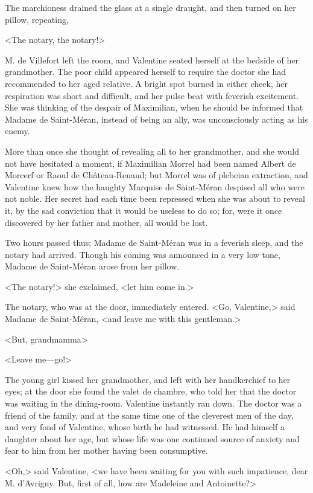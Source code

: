 The marchioness drained the glass at a single draught, and then turned on her pillow, repeating, 

 <The notary, the notary!> 

 M. de Villefort left the room, and Valentine seated herself at the bedside of her grandmother. The poor child appeared herself to require the doctor she had recommended to her aged relative. A bright spot burned in either cheek, her respiration was short and difficult, and her pulse beat with feverish excitement. She was thinking of the despair of Maximilian, when he should be informed that Madame de Saint-Méran, instead of being an ally, was unconsciously acting as his enemy. 

 More than once she thought of revealing all to her grandmother, and she would not have hesitated a moment, if Maximilian Morrel had been named Albert de Morcerf or Raoul de Château-Renaud; but Morrel was of plebeian extraction, and Valentine knew how the haughty Marquise de Saint-Méran despised all who were not noble. Her secret had each time been repressed when she was about to reveal it, by the sad conviction that it would be useless to do so; for, were it once discovered by her father and mother, all would be lost. 

 Two hours passed thus; Madame de Saint-Méran was in a feverish sleep, and the notary had arrived. Though his coming was announced in a very low tone, Madame de Saint-Méran arose from her pillow. 

 <The notary!> she exclaimed, <let him come in.> 

 The notary, who was at the door, immediately entered. <Go, Valentine,> said Madame de Saint-Méran, <and leave me with this gentleman.> 

 <But, grandmamma\longdash> 

 <Leave me—go!> 

 The young girl kissed her grandmother, and left with her handkerchief to her eyes; at the door she found the valet de chambre, who told her that the doctor was waiting in the dining-room. Valentine instantly ran down. The doctor was a friend of the family, and at the same time one of the cleverest men of the day, and very fond of Valentine, whose birth he had witnessed. He had himself a daughter about her age, but whose life was one continued source of anxiety and fear to him from her mother having been consumptive. 

 <Oh,> said Valentine, <we have been waiting for you with such impatience, dear M. d'Avrigny. But, first of all, how are Madeleine and Antoinette?> 

